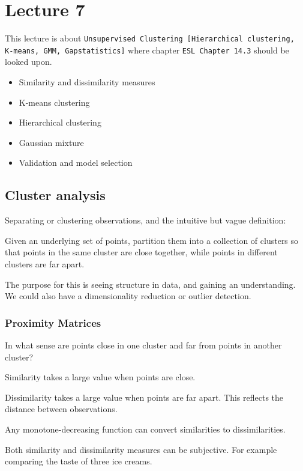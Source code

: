 \chapter{Lecture 7}

This lecture is about \texttt{Unsupervised Clustering
[Hierarchical clustering, K-means, GMM, Gapstatistics]} where chapter \texttt{ESL Chapter 14.3} should be looked upon.

\begin{itemize}
  \item Similarity and dissimilarity measures
  \item K-means clustering
  \item Hierarchical clustering
  \item Gaussian mixture
  \item Validation and model selection
\end{itemize}

\section{Cluster analysis}

Separating or clustering observations, and the intuitive but vague definition:

Given an underlying set of points, partition them into a collection
of clusters so that points in the same cluster are close together,
while points in different clusters are far apart.

The purpose for this is seeing structure in data, and gaining an understanding. We could also have a dimensionality reduction or outlier detection.



\subsection{Proximity Matrices}

In what sense are points close in one cluster and far from points in
another cluster?

Similarity takes a large value when points are close.

Dissimilarity takes a large value when points are far apart. This
reflects the distance between observations.

Any monotone-decreasing function can convert similarities to
dissimilarities.

Both similarity and dissimilarity measures can be subjective. For
example comparing the taste of three ice creams.



